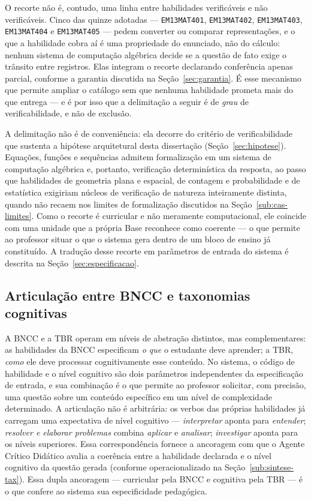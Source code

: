O recorte não é, contudo, uma linha entre habilidades verificáveis e não verificáveis. Cinco das
quinze adotadas --- \texttt{EM13MAT401}, \texttt{EM13MAT402}, \texttt{EM13MAT403},
\texttt{EM13MAT404} e \texttt{EM13MAT405} --- pedem converter ou comparar representações, e o que
a habilidade cobra aí é uma propriedade do enunciado, não do cálculo: nenhum sistema de computação
algébrica decide se a questão de fato exige o trânsito entre registros. Elas integram o recorte
declarando conferência apenas parcial, conforme a garantia discutida na
Seção~\ref{sec:garantia}. É esse mecanismo que permite ampliar o catálogo sem que nenhuma
habilidade prometa mais do que entrega --- e é por isso que a delimitação a seguir é de
\emph{grau} de verificabilidade, e não de exclusão.

A delimitação não é de conveniência: ela decorre do critério de verificabilidade que sustenta a
hipótese arquitetural desta dissertação (Seção~\ref{sec:hipotese}). Equações, funções e sequências
admitem formalização em um sistema de computação algébrica e, portanto, verificação determinística da
resposta, ao passo que habilidades de geometria plana e espacial, de contagem e probabilidade e de
estatística exigiriam núcleos de verificação de natureza inteiramente distinta, quando não recaem nos
limites de formalização discutidos na Seção~\ref{sub:cas-limites}. Como o recorte é curricular e não meramente
computacional, ele coincide com uma unidade que a própria Base reconhece como coerente --- o que
permite ao professor situar o que o sistema gera dentro de um bloco de ensino já constituído. A
tradução desse recorte em parâmetros de entrada do sistema é descrita na
Seção~\ref{sec:especificacao}.

\subsection{Articulação entre BNCC e taxonomias cognitivas}
\label{sub:bncc-taxonomias}

A BNCC e a TBR operam em níveis de abstração distintos, mas complementares: as habilidades da BNCC
especificam \emph{o que} o estudante deve aprender; a TBR, \emph{como} ele deve processar
cognitivamente esse conteúdo. No sistema, o código de habilidade e o nível cognitivo são dois
parâmetros independentes da especificação de entrada, e sua combinação é o que permite ao professor
solicitar, com precisão, uma questão sobre um conteúdo específico em um nível de complexidade
determinado. A articulação não é arbitrária: os verbos das próprias habilidades já carregam uma
expectativa de nível cognitivo --- \emph{interpretar} aponta para \emph{entender}; \emph{resolver e
elaborar problemas} combina \emph{aplicar} e \emph{analisar}; \emph{investigar} aponta para os níveis
superiores. Essa correspondência fornece a ancoragem com que o Agente Crítico Didático avalia a
coerência entre a habilidade declarada e o nível cognitivo da questão gerada (conforme operacionalizado
na Seção~\ref{sub:sintese-tax}). Essa dupla ancoragem --- curricular pela BNCC e cognitiva pela TBR --- é
o que confere ao sistema sua especificidade pedagógica.

